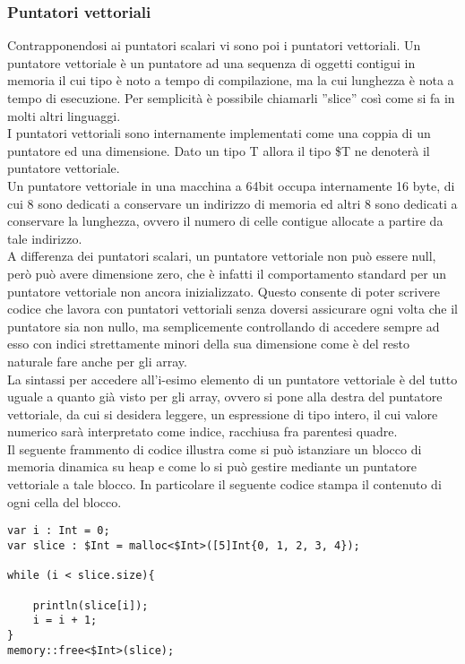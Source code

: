 \subsubsection{Puntatori vettoriali}
Contrapponendosi ai puntatori scalari vi sono poi i puntatori vettoriali. Un puntatore vettoriale è un puntatore ad una sequenza 
di oggetti contigui in memoria il cui tipo è noto a tempo di compilazione, ma la cui lunghezza è nota a tempo di esecuzione. Per 
semplicità è possibile chiamarli ”slice” così come si fa in molti altri linguaggi. \\

I puntatori vettoriali sono internamente implementati come una coppia di un puntatore ed una dimensione.  Dato un tipo T allora il tipo \$T ne denoterà 
il puntatore vettoriale. \\

Un puntatore vettoriale in una macchina a 64bit occupa internamente 16 byte, di cui 8 sono dedicati a conservare un 
indirizzo di memoria ed altri 8 sono dedicati a conservare la lunghezza, ovvero il numero di celle contigue allocate a partire da tale indirizzo. \\

A differenza dei puntatori scalari, un puntatore vettoriale non può essere null, però può avere dimensione zero, che è infatti il comportamento 
standard per un puntatore vettoriale non ancora inizializzato. Questo consente di poter scrivere codice che lavora con puntatori vettoriali senza 
doversi assicurare ogni volta che il puntatore sia non nullo, ma semplicemente controllando di accedere sempre ad esso con indici 
strettamente minori della sua dimensione come è del resto naturale fare anche per gli array. \\

La sintassi per accedere all’i-esimo elemento di un puntatore vettoriale è del tutto uguale a quanto già 
visto per gli array, ovvero si pone alla destra del puntatore vettoriale, da cui si desidera leggere, un espressione di tipo intero, il 
cui valore numerico sarà interpretato come indice, racchiusa fra parentesi quadre. \\

Il seguente frammento di codice illustra come si può istanziare un blocco di memoria dinamica su heap e come lo 
si può gestire mediante un puntatore vettoriale a tale blocco. In particolare il seguente codice stampa il contenuto di ogni cella del 
blocco. \\

\vspace{0.5cm}
\begin{lstlisting}[frame=single]
var i : Int = 0;
var slice : $Int = malloc<$Int>([5]Int{0, 1, 2, 3, 4});

while (i < slice.size){

    println(slice[i]);
    i = i + 1;
}
memory::free<$Int>(slice);
\end{lstlisting}
\vspace{0.5cm}


